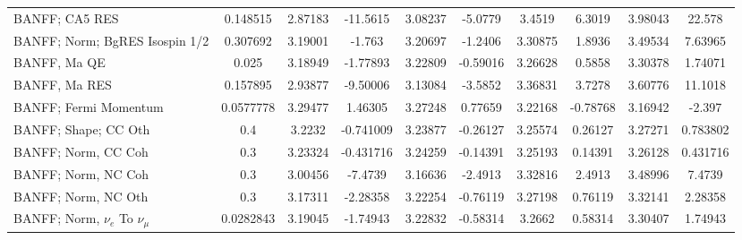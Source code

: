 \documentclass{standalone}
\begin{document}
\begin{tabular}{| l | S | S  S | S  S | S  S | S  S | }
                                                                  BANFF; CA5 RES &        0.148515 &         2.87183 &        -11.5615 &         3.08237 &         -5.0779 &          3.4519 &          6.3019 &         3.98043 &          22.578 \\ 
                                                  BANFF; Norm; BgRES Isospin 1/2 &        0.307692 &         3.19001 &          -1.763 &         3.20697 &         -1.2406 &         3.30875 &          1.8936 &         3.49534 &         7.63965 \\ 
                                                                    BANFF, Ma QE &           0.025 &         3.18949 &        -1.77893 &         3.22809 &        -0.59016 &         3.26628 &          0.5858 &         3.30378 &         1.74071 \\ 
                                                                   BANFF, Ma RES &        0.157895 &         2.93877 &        -9.50006 &         3.13084 &         -3.5852 &         3.36831 &          3.7278 &         3.60776 &         11.1018 \\ 
                                                           BANFF; Fermi Momentum &       0.0577778 &         3.29477 &         1.46305 &         3.27248 &         0.77659 &         3.22168 &        -0.78768 &         3.16942 &          -2.397 \\ 
                                                            BANFF; Shape; CC Oth &             0.4 &          3.2232 &       -0.741009 &         3.23877 &        -0.26127 &         3.25574 &         0.26127 &         3.27271 &        0.783802 \\ 
                                                             BANFF; Norm, CC Coh &             0.3 &         3.23324 &       -0.431716 &         3.24259 &        -0.14391 &         3.25193 &         0.14391 &         3.26128 &        0.431716 \\ 
                                                             BANFF; Norm, NC Coh &             0.3 &         3.00456 &         -7.4739 &         3.16636 &         -2.4913 &         3.32816 &          2.4913 &         3.48996 &          7.4739 \\ 
                                                             BANFF; Norm, NC Oth &             0.3 &         3.17311 &        -2.28358 &         3.22254 &        -0.76119 &         3.27198 &         0.76119 &         3.32141 &         2.28358 \\ 
                                           BANFF; Norm, $\nu_{e}$ To $\nu_{\mu}$ &       0.0282843 &         3.19045 &        -1.74943 &         3.22832 &        -0.58314 &          3.2662 &         0.58314 &         3.30407 &         1.74943 \\ 

\end{tabular}
\end{document}
